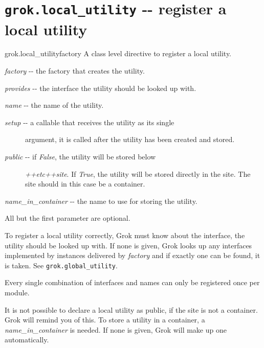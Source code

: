 \documentclass[10pt,a4paper,english]{manual}
\newcommand{\titlereference}[1]{\textsl{#1}}
\begin{document}
\section{\texttt{grok.local{\_}utility} -{}- register a local utility}
\begin{funcdesc}{grok.local{\_}utility}{factory}
A class level directive to register a local utility.

\titlereference{factory} -{}- the factory that creates the utility.

\titlereference{provides} -{}- the interface the utility should be looked up with.

\titlereference{name} -{}- the name of the utility.
\begin{description}
\item[{\titlereference{setup} -{}- a callable that receives the utility as its single}] %

argument, it is called after the utility has been created and
stored.

\item[{\titlereference{public} -{}- if \titlereference{False}, the utility will be stored below}] %

\titlereference{++etc++site}.  If \titlereference{True}, the utility will be stored directly
in the site.  The site should in this case be a container.

\end{description}

\titlereference{name{\_}in{\_}container} -{}- the name to use for storing the utility.

All but the first parameter are optional.

To register a local utility correctly, Grok must know about the
interface, the utility should be looked up with. If none is given,
Grok looks up any interfaces implemented by instances delivered by
\titlereference{factory} and if exactly one can be found, it is taken. See
\texttt{grok.global{\_}utility}.

Every single combination of interfaces and names can only be
registered once per module.

It is not possible to declare a local utility as public, if the
site is not a container. Grok will remind you of this. To store a
utility in a container, a \titlereference{name{\_}in{\_}container} is needed. If
none is given, Grok will make up one automatically.


\end{funcdesc}
\end{document}
